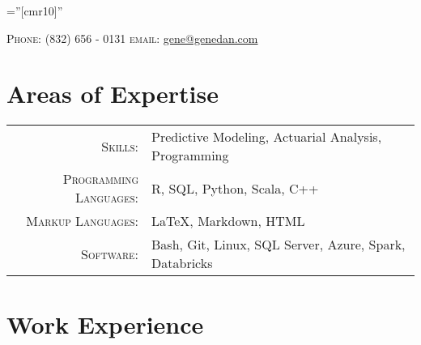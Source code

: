 \documentclass[10pt]{article} %
\begin{document}
\pagestyle{empty} %

\font\fb=''[cmr10]'' %


\par{\par} %

\begin{center}
\textsc{Phone:}  (832) 656 - 0131 \qquad
\textsc{email:}  \href{mailto:gene@genedan.com}{gene@genedan.com}
\end{center}



\section{Areas of Expertise}
\begin{tabular}{r|p{10cm}}
\textsc{Skills: } & Predictive Modeling, Actuarial Analysis, Programming\\
\textsc{Programming Languages: } & R, SQL, Python, Scala, C++\\
\textsc{Markup Languages: } & \LaTeX, Markdown, HTML\\
\textsc{Software: } & Bash, Git, Linux, SQL Server, Azure, Spark, Databricks\\
\end{tabular}


\section{Work Experience}
\end{document}

